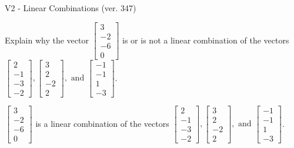 \begin{exercise}
  \begin{exerciseTitle}V2 - Linear Combinations (ver. 347)\end{exerciseTitle}
  \begin{exerciseStatement}
    Explain why the vector \(\left[\begin{array}{c}
3 \\
-2 \\
-6 \\
0
\end{array}\right]\)  is or is not a linear 
	combination of the vectors \(\left[\begin{array}{c}
2 \\
-1 \\
-3 \\
-2
\end{array}\right] , \left[\begin{array}{c}
3 \\
2 \\
-2 \\
2
\end{array}\right] , \text{ and } \left[\begin{array}{c}
-1 \\
-1 \\
1 \\
-3
\end{array}\right]\).
	


  \end{exerciseStatement}
  \begin{exerciseAnswer}
   \(\left[\begin{array}{c}
3 \\
-2 \\
-6 \\
0
\end{array}\right]\) 
  	 is  
	a linear combination of the vectors \(\left[\begin{array}{c}
2 \\
-1 \\
-3 \\
-2
\end{array}\right] , \left[\begin{array}{c}
3 \\
2 \\
-2 \\
2
\end{array}\right] , \text{ and } \left[\begin{array}{c}
-1 \\
-1 \\
1 \\
-3
\end{array}\right]\).

	
  


  \end{exerciseAnswer}
\end{exercise}